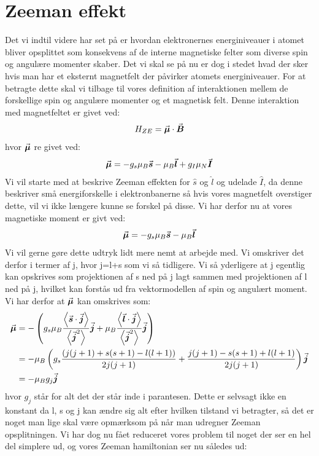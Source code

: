 \documentclass[../../Atom-ogMolekylefysik.tex]{subfiles}
\begin{document}
\section{Zeeman effekt}
Det vi indtil videre har set på er hvordan elektronernes energiniveauer i atomet bliver opsplittet som konsekvens af de interne magnetiske felter som diverse spin og angulære momenter skaber. Det vi skal se på nu er dog i stedet hvad der sker hvis man har et eksternt magnetfelt der påvirker atomets energiniveauer. For at betragte dette skal vi tilbage til vores definition af interaktionen mellem de forskellige spin og angulære momenter og et magnetisk felt. Denne interaktion med magnetfeltet er givet ved:
\begin{equation}
    H_{ZE}={\vec{\boldsymbol{\mu}}}\cdot{\vec{\boldsymbol{B}}}
\end{equation}
hvor ${\vec{\boldsymbol{\mu}}}$ re givet ved:
\begin{equation}
    {\vec{\boldsymbol{\mu}}}=-g_s\mu_B{\vec{\boldsymbol{s}}}-\mu_B{\vec{\boldsymbol{l}}}+g_I\mu_N{\vec{\boldsymbol{I}}}
\end{equation}
Vi vil starte med at beskrive Zeeman effekten for $\hat{s}$ og $\hat{l}$ og udelade $\hat{I}$, da denne beskriver små energiforskelle i elektronbanerne så hvis vores magnetfelt overstiger dette, vil vi ikke længere kunne se forskel på disse. Vi har derfor nu at vores magnetiske moment er givt ved:
\begin{equation}
    {\vec{\boldsymbol{\mu}}}=-g_s\mu_B{\vec{\boldsymbol{s}}}-\mu_B{\vec{\boldsymbol{l}}}
\end{equation}
Vi vil gerne gøre dette udtryk lidt mere nemt at arbejde med. Vi omskriver det derfor i termer af j, hvor j=l+s som vi så tidligere. Vi så yderligere at j egentlig kan opskrives som projektionen af s ned på j lagt sammen med projektionen af l ned på j, hvilket kan forstås ud fra vektormodellen af spin og angulært moment. Vi har derfor at ${\vec{\boldsymbol{\mu}}}$ kan omskrives som:
\begin{align*}
    {\vec{\boldsymbol{\mu}}}&=-\left(g_s\mu_B\frac{\left<{\vec{\boldsymbol{s}}}\cdot{\vec{\boldsymbol{j}}} \right>}{\left<{\vec{\boldsymbol{j}}}^2\right>}{\vec{\boldsymbol{j}}}+\mu_B\frac{\left<{\vec{\boldsymbol{l}}}\cdot{\vec{\boldsymbol{j}}} \right>}{\left<{\vec{\boldsymbol{j}}}^2\right>}{\vec{\boldsymbol{j}}}\right)\\
    &=-\mu_B\left(g_s\frac{(j(j+1)+s(s+1)-l(l+1))}{2j(j+1)}+\frac{j(j+1)-s(s+1)+l(l+1)}{2j(j+1)}\right){\vec{\boldsymbol{j}}}\\
    &=-\mu_Bg_j{\vec{\boldsymbol{j}}}
\end{align*}
hvor $g_j$ står for alt det der står inde i parantesen. Dette er selvsagt ikke en konstant da l, s og j kan ændre sig alt efter hvilken tilstand vi betragter, så det er noget man lige skal være opmærksom på når man udregner Zeeman opsplitningen. Vi har dog nu fået reduceret vores problem til noget der ser en hel del simplere ud, og vores Zeeman hamiltonian ser nu således ud:
\end{document}
